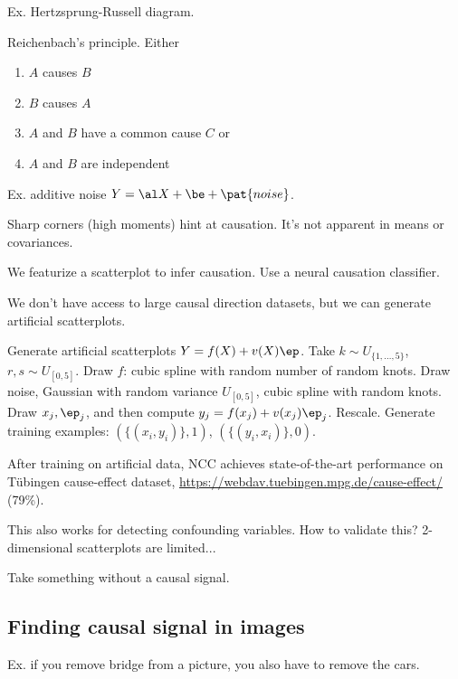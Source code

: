 Ex. Hertzsprung-Russell diagram.

Reichenbach's principle. Either
\begin{enumerate}
\item
$A$ causes $B$
\item
$B$ causes $A$
\item
$A$ and $B$ have a common cause $C$ or
\item
$A$ and $B$ are independent
\end{enumerate}
Ex. additive noise $Y=\al X+\be + \pat{noise}$. 

Sharp corners (high moments) hint at causation. It's not apparent in means or covariances.


We featurize a scatterplot to infer causation. Use a neural causation classifier.

We don't have access to large causal direction datasets, but we can generate artificial scatterplots. 

Generate artificial scatterplots $Y=f(X) + v(X)\ep$. Take $k\sim U_{\{1,\ldots, 5\}}$, $r,s\sim U_{[0,5]}$. Draw $f$: cubic spline with random number of random knots. Draw noise, Gaussian with random variance $U_{[0,5]}$, cubic spline with random knots. Draw $x_j,\ep_j$, and then compute $y_j=f(x_j) + v(x_j)\ep_j$. Rescale.
Generate training examples: $(\{(x_i,y_i)\},1)$, $(\{(y_i,x_i)\},0)$. 

After training on artificial data, NCC achieves state-of-the-art performance on T\"ubingen cause-effect dataset, \url{https://webdav.tuebingen.mpg.de/cause-effect/} (79\%). 

This also works for detecting confounding variables. How to validate this? 2-dimensional scatterplots are limited...

Take something without a causal signal. 

\subsection{Finding causal signal in images}

Ex. if you remove bridge from a picture, you also have to remove the cars.

